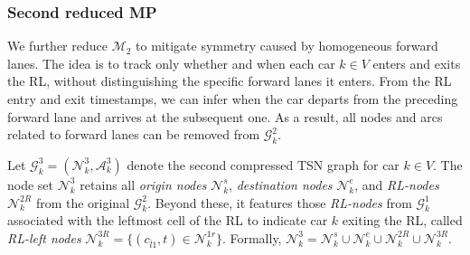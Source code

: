 \documentclass[12pt]{article}
\begin{document}




\subsubsection{Second reduced MP}
We further reduce $\mathcal{M}_2$ to mitigate symmetry caused by homogeneous forward lanes. The idea is to track only whether and when each car $k\in V$ enters and exits the RL, without distinguishing the specific forward lanes it enters. From the RL entry and exit timestamps, we can infer when the car departs from the preceding forward lane and arrives at the subsequent one. As a result, all nodes and arcs related to forward lanes can be removed from $\mathcal{G}^2_k$.



Let $\mathcal{G}^3_k=(\mathcal{N}^3_k,\mathcal{A}^3_k)$ denote the second compressed TSN graph for car $k\in V$. The node set $\mathcal{N}^3_k$ retains all \textit{origin nodes} $\mathcal{N}^s_k$, \textit{destination nodes} $\mathcal{N}^e_k$, and \textit{RL-nodes} $\mathcal{N}^{2R}_k$ from the original $\mathcal{G}^2_k$. Beyond these, it features those \textit{RL-nodes} from $\mathcal{G}^1_k$ associated with the leftmost cell of the RL to indicate car $k$ exiting the RL, %
called \textit{RL-left nodes} $\mathcal{N}^{3R}_k=\{(c_{\bar{l}1},t)\in \mathcal{N}^{1r}_k\}$. Formally, $\mathcal{N}^3_k=\mathcal{N}^s_k\cup \mathcal{N}^e_k\cup \mathcal{N}^{2R}_k\cup \mathcal{N}^{3R}_k$.
\end{document}
